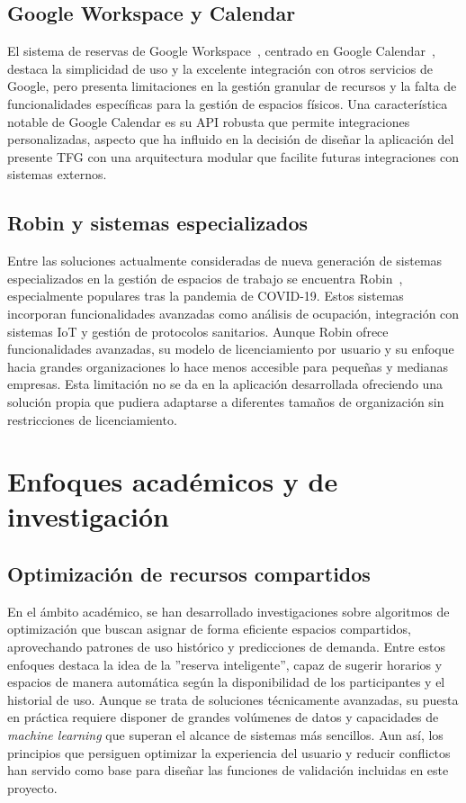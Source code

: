 \subsection{Google Workspace y Calendar}\label{google-workspace-calendar}
El sistema de reservas de Google Workspace~\cite{google-workspace}, centrado en Google Calendar~\cite{google-calendar}, destaca la simplicidad de uso y la excelente integración con otros servicios de Google, pero presenta limitaciones en la gestión granular de recursos y la falta de funcionalidades específicas para la gestión de espacios físicos.
Una característica notable de Google Calendar es su API robusta que permite integraciones personalizadas, aspecto que ha influido en la decisión de diseñar la aplicación del presente TFG con una arquitectura modular que facilite futuras integraciones con sistemas externos.

\subsection{Robin y sistemas especializados}\label{robin-sistemas-especializados}
Entre las soluciones actualmente consideradas de nueva generación de sistemas especializados en la gestión de espacios de trabajo se encuentra Robin~\cite{robin}, especialmente populares tras la pandemia de COVID-19. Estos sistemas incorporan funcionalidades avanzadas como análisis de ocupación, integración con sistemas IoT y gestión de protocolos sanitarios.
Aunque Robin ofrece funcionalidades avanzadas, su modelo de licenciamiento por usuario y su enfoque hacia grandes organizaciones lo hace menos accesible para pequeñas y medianas empresas. Esta limitación no se da en la aplicación desarrollada ofreciendo una solución propia que pudiera adaptarse a diferentes tamaños de organización sin restricciones de licenciamiento.

\section{Enfoques académicos y de investigación}\label{enfoques-academicos-investigacion}
\subsection{Optimización de recursos compartidos}\label{optimizacion-recursos-compartidos}
En el ámbito académico, se han desarrollado investigaciones sobre algoritmos de optimización que buscan asignar de forma eficiente espacios compartidos, aprovechando patrones de uso histórico y predicciones de demanda. Entre estos enfoques destaca la idea de la ''reserva inteligente'', capaz de sugerir horarios y espacios de manera automática según la disponibilidad de los participantes y el historial de uso.
Aunque se trata de soluciones técnicamente avanzadas, su puesta en práctica requiere disponer de grandes volúmenes de datos y capacidades de \emph{machine learning} que superan el alcance de sistemas más sencillos. Aun así, los principios que persiguen optimizar la experiencia del usuario y reducir conflictos han servido como base para diseñar las funciones de validación incluidas en este proyecto.

